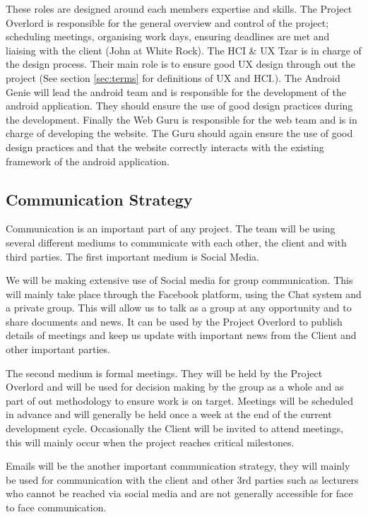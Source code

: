 \documentclass[11pt,a4paper]{article}
\begin{document}
These roles are designed around each members expertise and skills. The Project Overlord is responsible for the general overview and control of the project; scheduling meetings, organising work days, ensuring deadlines are met and liaising with the client (John at White Rock). The HCI \& UX Tzar is in charge of the design process. Their main role is to ensure good UX design through out the project (See section \ref{sec:terms} for definitions of UX and HCI.). The Android Genie will lead the android team and is responsible for the development of the android application. They should ensure the use of good design practices during the development. Finally the Web Guru is responsible for the web team and is in charge of developing the website. The Guru should again ensure the use of good design practices and that the website correctly interacts with the existing framework of the android application. 

\subsection{Communication Strategy}

Communication is an important part of any project. The team will be using several different mediums to communicate with each other, the client and with third parties. The first important medium is Social Media. 

We will be making extensive use of Social media for group communication. This will mainly take place through the Facebook platform, using the Chat system and a private group. This will allow us to talk as a group at any opportunity and to share documents and news. It can be used by the Project Overlord to publish details of meetings and keep us update with important news from the Client and other important parties. 

The second medium is formal meetings. They will be held by the Project Overlord and will be used for decision making by the group as a whole and as part of out methodology to ensure work is on target. Meetings will be scheduled in advance and will generally be held once a week at the end of the current development cycle. Occasionally the Client will be invited to attend meetings, this will mainly occur when the project reaches critical milestones. 

Emails will be the another important communication strategy, they will mainly be used for communication with the client and other 3rd parties such as lecturers who cannot be reached via social media and are not generally accessible for face to face communication. 
\end{document}
